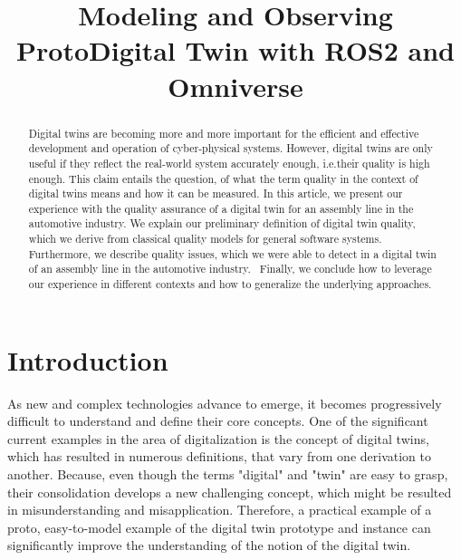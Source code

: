 \documentclass[conference]{IEEEtran}
\begin{document}
    \title{Modeling and Observing ProtoDigital Twin with ROS2 and Omniverse}
    \author{ 
    }
    
    \maketitle

    \begin{abstract}
        Digital twins are becoming more and more important for the efficient and effective development and operation of cyber-physical systems.
        However, digital twins are only useful if they reflect the real-world system accurately enough, i.e.their quality is high enough. 
        This claim entails the question, of what the term quality in the context of digital twins means and how it can be measured. 
        In this article, we present our experience with the quality assurance of a digital twin for an assembly line in the automotive industry.
        We explain our preliminary definition of digital twin quality, which we derive from classical quality models for general software systems. 
        Furthermore, we describe quality issues, which we were able to detect in a digital twin of an assembly line in the automotive industry. \
        Finally, we conclude how to leverage our experience in different contexts and how to generalize the underlying approaches.
    \end{abstract}

    \section{Introduction}\label{section:introduction}
    As new and complex technologies advance to emerge, it becomes progressively difficult to understand and define their core concepts. 
    One of the significant current examples in the area of digitalization is the concept of digital twins, which has resulted in numerous definitions,
    that vary from one derivation to another. Because, even though the terms "digital" and "twin" are easy to grasp,  their consolidation develops a new challenging concept,
    which might be resulted in misunderstanding and misapplication.
    Therefore, a practical example of a proto, easy-to-model example of the digital twin prototype and instance can significantly improve 
    the understanding of the notion of the digital twin.\cite{QualityandCompetitionanEssayinEconomicTheory}
    
\end{document}
